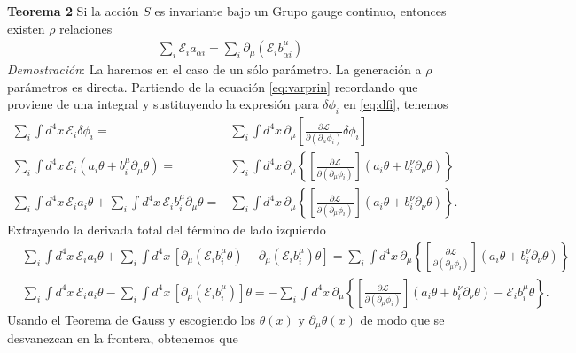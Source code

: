 \textbf{Teorema 2} Si la acción $S$ es invariante bajo un Grupo gauge continuo, entonces existen $\rho$ relaciones
\begin{align}
  \sum_{i}\mathcal{E}_{i} a_{\alpha i}=\sum_{i} \partial_{\mu} \left( \mathcal{E}_{i} b^{\mu}_{\alpha i} \right)
\end{align}
\emph{Demostración}: La haremos en el caso de un sólo parámetro. La generación a $\rho$ parámetros es directa. Partiendo de la ecuación \eqref{eq:varprin} recordando que proviene de una integral y sustituyendo la expresión para $\delta\phi_i$ en \eqref{eq:dfi}, tenemos
\begin{align}
    \sum_i\int {d^4}x\, \mathcal{E}_i \delta\phi_i = & \sum_{i}\int {d^4}x\, \partial_{\mu} \left[  \frac{\partial\mathcal{L}}{\partial(\partial_{\mu}\phi_i)}\delta\phi_i \right]\nonumber\\
      \sum_i \int {d^4}x\, \mathcal{E}_i \left( a_i \theta +b^{\mu}_i \partial_{\mu}\theta \right) =&  \sum_i \int {d^4}x\, \partial_{\mu} \left\{ \left[ \frac{\partial\mathcal{L}}{\partial(\partial_{\mu}\phi_i)}\right] \left( a_i \theta +b^{\nu}_i \partial_{\nu}\theta \right)  \right\}\nonumber\\
      \sum_i \int {d^4}x\, \mathcal{E}_ia_i \theta+\sum_i \int {d^4}x\, \mathcal{E}_i b^{\mu}_i \partial_{\mu}\theta  =&  \sum_i \int {d^4}x\, \partial_{\mu} \left\{ \left[ \frac{\partial\mathcal{L}}{\partial(\partial_{\mu}\phi_i)}\right] \left( a_i \theta +b^{\nu}_i \partial_{\nu}\theta \right)  \right\}.
\end{align}
Extrayendo la derivada total del término de lado izquierdo 
\begin{align}
   &   \sum_i \int {d^4}x\, \mathcal{E}_ia_i \theta+\sum_i \int {d^4}x\, \left[ \partial_{\mu} \left(  \mathcal{E}_i b^{\mu}_i \theta \right)-\partial_{\mu} \left(  \mathcal{E}_i b^{\mu}_i  \right) \theta \right]  =  \sum_i \int {d^4}x\, \partial_{\mu} \left\{ \left[ \frac{\partial\mathcal{L}}{\partial(\partial_{\mu}\phi_i)}\right] \left( a_i \theta +b^{\nu}_i \partial_{\nu}\theta \right)  \right\}\nonumber\\
&        \sum_i \int {d^4}x\, \mathcal{E}_ia_i \theta-\sum_i \int {d^4}x\, \left[ \partial_{\mu}   \left(  \mathcal{E}_i b^{\mu}_i  \right) \right] \theta   =-  \sum_i \int {d^4}x\, \partial_{\mu} \left\{ \left[ \frac{\partial\mathcal{L}}{\partial(\partial_{\mu}\phi_i)}\right] \left( a_i \theta +b^{\nu}_i \partial_{\nu}\theta \right) -\mathcal{E}_i b^{\mu}_i \theta  \right\}.
\end{align}
Usando el Teorema de Gauss y escogiendo los $\theta(x)$ y $\partial_{\mu}\theta(x)$ de modo que se desvanezcan en la frontera, obtenemos que
